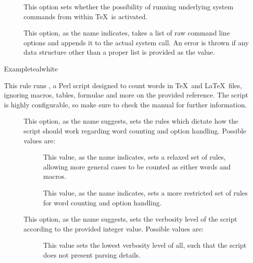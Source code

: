 \begin{description}
\begin{description}
\item[] This option sets whether the possibility of running underlying system commands from within \TeX\ is activated.

\item[] This option, as the name indicates, takes a list of raw command line options and appends it to the actual system call. An error is thrown if any data structure other than a proper list is provided as the value.
\end{description}

\begin{codebox}{Example}{teal}{\icnote}{white}
\end{codebox}

\item[\rulebox{texcount}]
This rule runs , a Perl script designed to count words in \TeX\ and \LaTeX\ files, ignoring macros, tables, formulae and more on the provided  reference. The script is highly configurable, so make sure to check the manual for further information. 

\begin{description}
\item[] This option, as the name suggests, sets the rules which dictate how the script should work regarding word counting and option handling. Possible values are:

\begin{description}
\item[] This value, as the name indicates, sets a relaxed set of rules, allowing more general cases to be counted as either words and macros.

\item[] This value, as the name indicates, sets a more restricted set of rules for word counting and option handling.
\end{description}

\item[] This option, as the name suggests, sets the verbosity level of the script according to the provided integer value. Possible values are:

\begin{description}
\item[] This value sets the lowest verbosity level of all, such that the script does not present parsing details.


\end{description}
\end{description}
\end{description}
